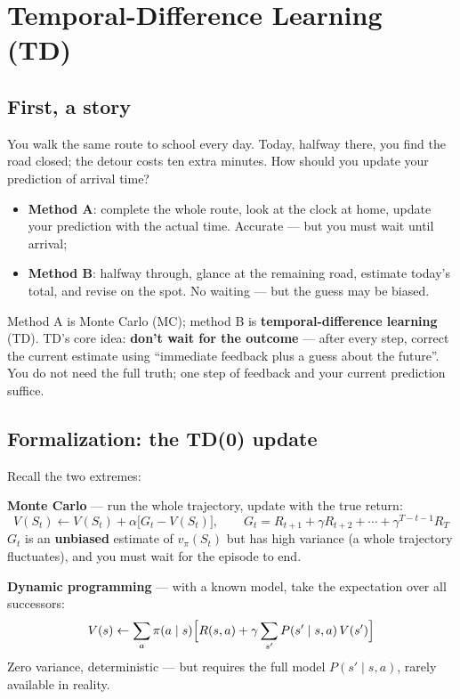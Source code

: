 \documentclass{article}
\begin{document}
\section*{Temporal-Difference Learning (TD)}

\subsection*{First, a story}

You walk the same route to school every day. Today, halfway there, you find the road closed; the detour costs ten extra minutes. How should you update your prediction of arrival time?

\begin{itemize}
  \item \textbf{Method A}: complete the whole route, look at the clock at home, update your prediction with the actual time. Accurate --- but you must wait until arrival;
  \item \textbf{Method B}: halfway through, glance at the remaining road, estimate today's total, and revise on the spot. No waiting --- but the guess may be biased.
\end{itemize}

Method A is Monte Carlo (MC); method B is \textbf{temporal-difference learning} (TD). TD's core idea: \textbf{don't wait for the outcome} --- after every step, correct the current estimate using ``immediate feedback plus a guess about the future''. You do not need the full truth; one step of feedback and your current prediction suffice.

\subsection*{Formalization: the TD(0) update}

Recall the two extremes:

\textbf{Monte Carlo} --- run the whole trajectory, update with the true return:
\[
V(S_t) \leftarrow V(S_t) + \alpha\bigl[G_t - V(S_t)\bigr], \qquad
G_t = R_{t+1} + \gamma R_{t+2} + \cdots + \gamma^{T-t-1} R_T
\]
$G_t$ is an \textbf{unbiased} estimate of $v_\pi(S_t)$ but has high variance (a whole trajectory fluctuates), and you must wait for the episode to end.

\textbf{Dynamic programming} --- with a known model, take the expectation over all successors:
\[
V(s) \leftarrow \sum_a \pi(a\mid s)\Bigl[R(s,a) + \gamma\sum_{s'} P(s'\mid s,a)\,V(s')\Bigr]
\]
Zero variance, deterministic --- but requires the full model $P(s'\mid s,a)$, rarely available in reality.
\end{document}
